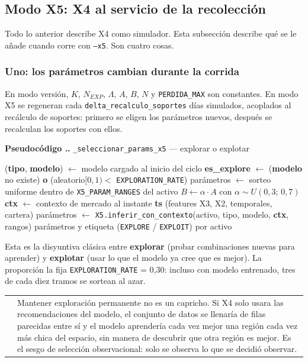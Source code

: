 \documentclass[11pt,a4paper]{article}
\makeatletter
\newcommand{\code}[1]{\texttt{\small #1}}
\newcounter{pcode}[section]
\renewcommand{\thepcode}{\thesection.\arabic{pcode}}
\newenvironment{pseudo}[1]{%
  \par\medskip\noindent
  \refstepcounter{pcode}%
  \colorbox{cfondo}{\parbox{\dimexpr\linewidth-2\fboxsep\relax}{%
    \small\textbf{\textcolor{cazul}{Pseudocódigo \thepcode.}} #1}}%
  \par\nobreak\smallskip\begin{algorithmic}[1]%
}{\end{algorithmic}\par\medskip}
\newenvironment{nota}{%
  \par\medskip\noindent
  \begin{tabular}{@{}p{0.4em}@{\hspace{8pt}}p{\dimexpr\linewidth-2em\relax}@{}}
  \textcolor{cnaranja}{\rule{3pt}{1.1em}} &
}{\end{tabular}\par\medskip}
\newcommand{\bigsep}{\par\vspace{3pt}}
\makeatother
\begin{document}
\subsection{Modo X5: X4 al servicio de la recolección}
\label{sec:x4-x5mode}

Todo lo anterior describe X4 como simulador. Esta subsección describe qué se le añade
cuando corre con \code{--x5}. Son cuatro cosas.

\subsubsection{Uno: los parámetros cambian durante la corrida}
\label{sec:x4-x5params}

En modo versión, $K$, $N_{EXP}$, $\Lambda$, $A$, $B$, $N$ y \code{PERDIDA_MAX} son
constantes. En modo X5 se regeneran cada \code{delta_recalculo_soportes} días simulados,
acoplados al recálculo de soportes: primero se eligen los parámetros nuevos, después se
recalculan los soportes con ellos.

\begin{pseudo}{\code{_seleccionar_params_x5} — explorar o explotar}
  \State (\textbf{tipo}, \textbf{modelo}) $\gets$ modelo cargado al inicio del ciclo
  \State \textbf{es_explore} $\gets$ (\textbf{modelo} no existe) \textbf{o} (aleatorio$[0,1) <$ \code{EXPLORATION_RATE})
     \State parámetros $\gets$ sorteo uniforme dentro de \code{X5_PARAM_RANGES} del activo
     \State $B \gets \alpha \cdot A$ con $\alpha \sim U(0{,}3;\,0{,}7)$ 
  \Else
     \State \textbf{ctx} $\gets$ contexto de mercado al instante \textbf{ts} (features X3, X2, temporales, cartera)
     \State parámetros $\gets$ \code{X5.inferir_con_contexto}(activo, tipo, modelo, \textbf{ctx}, rangos)
  \EndIf
\EndFor
\State \Return parámetros y etiqueta (\code{EXPLORE} / \code{EXPLOIT}) por activo
\end{pseudo}

\bigsep
Esta es la disyuntiva clásica entre \textbf{explorar} (probar combinaciones nuevas para
aprender) y \textbf{explotar} (usar lo que el modelo ya cree que es mejor). La proporción la
fija \code{EXPLORATION_RATE} = 0,30: incluso con modelo entrenado, tres de cada diez tramos
se sortean al azar.

\begin{nota}
Mantener exploración permanente no es un capricho. Si X4 solo usara las recomendaciones del
modelo, el conjunto de datos se llenaría de filas parecidas entre sí y el modelo aprendería
cada vez mejor una región cada vez más chica del espacio, sin manera de descubrir que otra
región es mejor. Es el sesgo de selección observacional: solo se observa lo que se decidió
observar.
\end{nota}
\end{document}
